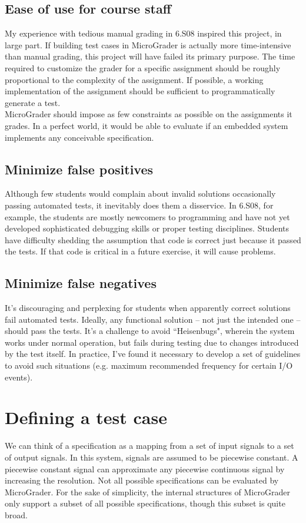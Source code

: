 \documentclass[12pt]{article}
\begin{document}
\subsection{Ease of use for course staff}
My experience with tedious manual grading in 6.S08 inspired this project, in large part.  If building test cases in MicroGrader is actually more time-intensive than manual grading, this project will have failed its primary purpose.  The time required to customize the grader for a specific assignment should be roughly proportional to the complexity of the assignment.  If possible, a working implementation of the assignment should be sufficient to programmatically generate a test.\\

MicroGrader should impose as few constraints as possible on the assignments it grades.  In a perfect world, it would be able to evaluate if an embedded system implements any conceivable specification.

\subsection{Minimize false positives}
Although few students would complain about invalid solutions occasionally passing automated tests, it inevitably does them a disservice.  In 6.S08, for example, the students are mostly newcomers to programming and have not yet developed sophisticated debugging skills or proper testing disciplines.  Students have difficulty shedding the assumption that code is correct just because it passed the tests.  If that code is critical in a future exercise, it will cause problems.

\subsection{Minimize false negatives}
It's discouraging and perplexing for students when apparently correct solutions fail automated tests.  Ideally, any functional solution -- not just the intended one -- should pass the tests.  It's a challenge to avoid ``Heisenbugs", wherein the system works under normal operation, but fails during testing due to changes introduced by the test itself.  In practice, I've found it necessary to develop a set of guidelines to avoid such situations (e.g. maximum recommended frequency for certain I/O events).

\newpage
\section{Defining a test case}
We can think of a specification as a mapping from a set of input signals to a set of output signals.  In this system, signals are assumed to be piecewise constant.  A piecewise constant signal can approximate any piecewise continuous signal by increasing the resolution.  Not all possible specifications can be evaluated by MicroGrader.  For the sake of simplicity, the internal structures of MicroGrader only support a subset of all possible specifications, though this subset is quite broad.
\end{document}

